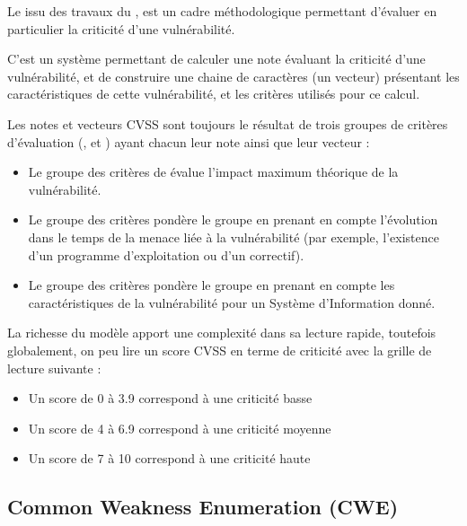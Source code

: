 Le   issu des travaux du  , est un cadre méthodologique permettant d'évaluer en particulier la criticité d'une vulnérabilité.


C'est un système permettant de calculer une note évaluant la criticité d'une vulnérabilité, et de construire une chaine de caractères (un vecteur) présentant les caractéristiques de cette vulnérabilité, et les critères utilisés pour ce calcul.

Les notes et vecteurs CVSS sont toujours le résultat de trois groupes de critères d'évaluation (,  et ) ayant chacun leur note ainsi que leur vecteur :
\begin{itemize}
  \item Le groupe des critères de\textbf{ } évalue l'impact maximum théorique de la vulnérabilité.
  \item Le groupe des critères\textbf{   }pondère le groupe  en prenant en compte  l'évolution dans le temps de la menace liée à la vulnérabilité  (par exemple, l'existence d'un programme d’exploitation ou d'un correctif).
  \item Le groupe des critères\textbf{  }pondère le groupe  en prenant en compte les caractéristiques de la vulnérabilité pour un Système d'Information donné.
\end{itemize}

La richesse du modèle apport une complexité dans sa lecture rapide, toutefois globalement, on peu lire un score CVSS en terme de criticité avec la grille de lecture suivante :

\begin{itemize}
  \item Un score de 0 à 3.9 correspond à une criticité basse
  \item Un score de 4 à 6.9 correspond à une criticité moyenne
  \item Un score de 7 à 10 correspond à une criticité haute
\end{itemize}


\subsection{Common Weakness Enumeration (CWE)}

